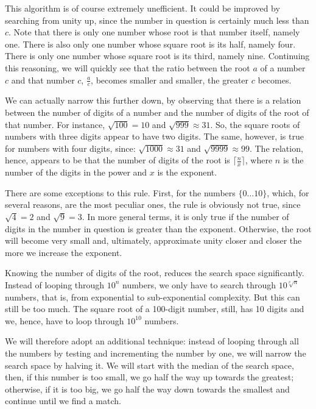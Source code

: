 \documentclass{scrreprt}
\newcommand{\Varid}[1]{\mathit{#1}}
\begin{document}
This algorithm is of course extremely unefficient.
It could be improved by searching from unity up,
since the number in question is certainly
much less than $c$. Note that there is only one
number whose root is that number itself,
namely one. There is also only one number
whose square root is its half, namely four.
There is only one number whose square root
is its third, namely nine.
Continuing this reasoning,
we will quickly see that 
the ratio between the root \ensuremath{\Varid{a}} of a number \ensuremath{\Varid{c}}
and that number \ensuremath{\Varid{c}}, $\frac{a}{c}$,
becomes smaller and smaller,
the greater \ensuremath{\Varid{c}} becomes.

We can actually narrow this further down,
by observing that there is a relation between
the number of digits of a number and the number
of digits of the root of that number.
For instance, $\sqrt{100} = 10$ and
$\sqrt{999} \approx 31$. 
So, the square roots of numbers with three digits
appear to have two digits.
The same, however, is true
for numbers with four digits, since:
$\sqrt{1000} \approx 31$ and
$\sqrt{9999} \approx 99$.
The relation, hence, appears to be
that the number of digits of the root is
$\lceil \frac{n}{x}\rceil$, where $n$ is the number of the digits 
in the power and $x$ is the exponent.

There are some exceptions to this rule.
First, for the numbers $\lbrace 0 \dots 10\rbrace$,
which, for several reasons, are the most peculiar ones,
the rule is obviously not true,
since $\sqrt{4} = 2$ and $\sqrt{9} = 3$.
In more general terms, 
it is only true if the number of digits in the number
in question is greater than the exponent.
Otherwise, the root will become very small
and, ultimately, approximate unity 
closer and closer the more we increase the exponent.

Knowing the number of digits
of the root, reduces the search space
significantly.
Instead of looping through $10^n$ numbers,
we only have to search through $10^{\sqrt[p]{n}}$ numbers,
that is, from exponential to sub-exponential complexity.
But this can still be too much.
The square root of a 100-digit number, still,
has 10 digits and we, hence, have to loop through
$10^{10}$ numbers.

We will therefore adopt an additional technique:
instead of looping through all the numbers
by testing and incrementing the number by one,
we will narrow the search space by halving it.
We will start with the median of the search space,
then, if this number is too small, 
we go half the way up towards the greatest;
otherwise, if it is too big,
we go half the way down towards the smallest
and continue until we find a match.
\end{document}
